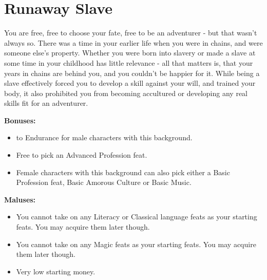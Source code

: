 \section{Runaway Slave}
You are free, free to choose your fate, free to be an adventurer - but that wasn't always so. There was a time in your earlier life when you were in chains, and were someone else's property. Whether you were born into slavery or made a slave at some time in your childhood has little relevance - all that matters is, that your years in chains are behind you, and you couldn't be happier for it. While being a slave effectively forced you to develop a skill against your will, and trained your body, it also prohibited you from becoming accultured or developing any real skills fit for an adventurer.


\textbf{Bonuses:}
\begin{itemize}
	\item {} to Endurance for male characters with this background.
	\item Free to pick an Advanced Profession feat.
	\item Female characters with this background can also pick either a Basic Profession feat, Basic Amorous Culture or Basic Music.
\end{itemize}
\textbf{Maluses:}
\begin{itemize}
	\item You cannot take on any Literacy or Classical language feats as your starting feats. You may acquire them later though.
	\item You cannot take on any Magic feats as your starting feats. You may acquire them later though.
	\item Very low starting money.
\end{itemize}

